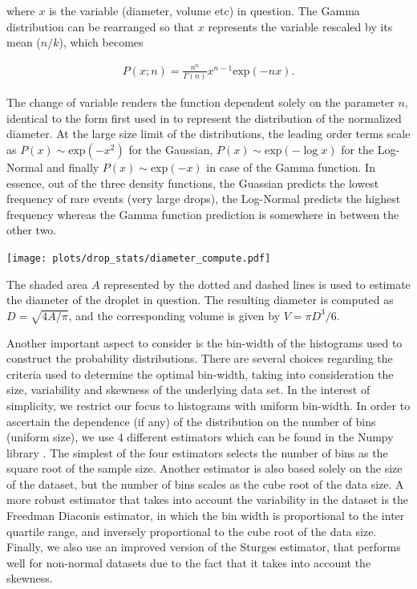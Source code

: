 where $x$ is the variable (diameter, volume etc) in question. 
The Gamma distribution can be rearranged so that $x$ represents
the variable rescaled by its mean ($n / k$), which becomes 

\begin{align}
	P\left( x ; n \right) = \frac{n^{n}}{\Gamma(n)} x^{n-1} \textrm{exp}\left(-n x\right) . 
\end{align}

The change of variable renders the function dependent solely 
on the parameter $n$, identical to the form first used in \cite{vill_2}
to represent the distribution of the normalized diameter.  
At the large size limit of the distributions, the leading order terms 
scale as $P(x) \sim \textrm{exp}(-x^2)$ for the Gaussian, $P(x) \sim \textrm{exp}(- \log x)$ for 
the Log-Normal and finally $P(x) \sim \textrm{exp}(- x)$ in case of the Gamma function. 
In essence, out of the three density functions, the Guassian predicts the lowest frequency of
rare events (very large drops), the Log-Normal predicts the highest frequency whereas
the Gamma function prediction is somewhere in between the other two. 

\begin{marginfigure}[-1cm]
\centering
\texttt{[image: plots/drop\_stats/diameter\_compute.pdf]}
\caption{The shaded area $A$ represented by the dotted and dashed lines
	is used to estimate the diameter of the droplet in question.
	The resulting diameter is computed as $D = \sqrt{4A/\pi}$,
	and the corresponding volume is given by $V = \pi D^3/6$.
	} 
\label{dia_compute}
\end{marginfigure}

Another important aspect to consider is the bin-width of the 
histograms used to construct the probability distributions. 
There are several choices regarding the criteria used to determine the optimal bin-width, 
taking into consideration the size, variability and skewness of the underlying data set. 
In the interest of simplicity, we restrict our focus to histograms with uniform bin-width. 
In order to ascertain the dependence (if any) of the distribution on the number of bins  
(uniform size), we use $4$ different estimators which can be found in the Numpy library \cite{numpy}.
The simplest of the four estimators selects the number 
of bins as the square root of the sample size.
Another estimator is also based solely on the size of the dataset, 
but the number of bins scales as the cube root of the data size.  
A more robust estimator that takes into account the variability in the dataset
is the Freedman Diaconis estimator, in which the bin width is proportional to the 
inter quartile range, and inversely proportional to the cube root of the data size. 
Finally, we also use an improved version of the Sturges estimator, that performs 
well for non-normal datasets due to the fact that it takes into account the skewness. 

